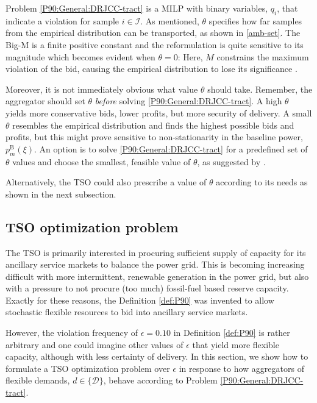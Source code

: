 \documentclass[conference]{IEEEtran}
\begin{document}
Problem \eqref{P90:General:DRJCC-tract} is a \ac{MILP} with binary variables, $q_{i}$, that indicate a violation for sample $i \in \mathcal{I}$. As mentioned, $\theta$ specifies how far samples from the empirical distribution can be transported, as shown in \eqref{amb-set}. The Big-M is a finite positive constant and the reformulation is quite sensitive to its magnitude which becomes evident when $\theta = 0$: Here, $M$ constrains the maximum violation of the bid, causing the empirical distribution to lose its significance \cite[Theorem 2, Remark 1]{chen2022data}.

Moreover, it is not immediately obvious what value $\theta$ should take. Remember, the aggregator should set $\theta$ \textit{before} solving \eqref{P90:General:DRJCC-tract}. A high $\theta$ yields more conservative bids, lower profits, but more security of delivery. A small $\theta$ resembles the empirical distribution and finds the highest possible bids and profits, but this might prove sensitive to non-stationarity in the baseline power, $p_{m}^{\text{B}}(\xi)$. An option is to solve \eqref{P90:General:DRJCC-tract} for a predefined set of $\theta$ values and choose the smallest, feasible value of $\theta$, as suggested by \cite[Section 3.2]{chen2022data}.

Alternatively, the \ac{TSO} could also prescribe a value of $\theta$ according to its needs as shown in the next subsection.


\subsection{\ac{TSO} optimization problem}

The \ac{TSO} is primarily interested in procuring sufficient supply of capacity for its ancillary service markets to balance the power grid. This is becoming increasing difficult with more intermittent, renewable generation in the power grid, but also with a pressure to not procure (too much) fossil-fuel based reserve capacity. Exactly for these reasons, the Definition \ref{def:P90} was invented to allow stochastic flexible resources to bid into ancillary service markets.

However, the violation frequency of $\epsilon = 0.10$ in Definition \ref{def:P90} is rather arbitrary and one could imagine other values of $\epsilon$ that yield more flexible capacity, although with less certainty of delivery. In this section, we show how to formulate a \ac{TSO} optimization problem over $\epsilon$ in response to how aggregators of flexible demands, $d \in \{\mathcal{D} \}$, behave according to Problem \eqref{P90:General:DRJCC-tract}.
\end{document}
